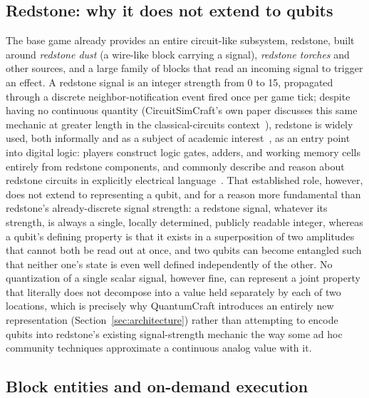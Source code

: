 \subsection{Redstone: why it does not extend to qubits}

The base game already provides an entire circuit-like subsystem, redstone, built around
\emph{redstone dust} (a wire-like block carrying a signal), \emph{redstone torches} and other
sources, and a large family of blocks that read an incoming signal to trigger an effect. A
redstone signal is an integer strength from 0 to 15, propagated through a discrete
neighbor-notification event fired once per game tick; despite having no continuous quantity
(CircuitSimCraft's own paper discusses this same mechanic at greater length in the
classical-circuits context~\cite{picos2026circuitsimcraft}), redstone is widely used, both
informally and as a subject of academic interest~\cite{nebel2016mining}, as an entry point
into digital logic:
players construct logic gates, adders, and working memory cells entirely from redstone
components, and commonly describe and reason about redstone circuits in explicitly
electrical language~\cite{dezuanni2015redstone}. That established role, however, does not
extend to representing a qubit, and for a reason more fundamental than redstone's
already-discrete signal strength: a redstone signal, whatever its strength, is always a
single, locally determined, publicly readable integer, whereas a qubit's defining property is
that it exists in a superposition of two amplitudes that cannot both be read out at once, and
two qubits can become entangled such that neither one's state is even well defined
independently of the other. No quantization of a single scalar signal, however fine, can
represent a joint property that literally does not decompose into a value held separately by
each of two locations, which is precisely why QuantumCraft introduces an entirely new
representation (Section~\ref{sec:architecture}) rather than attempting to encode qubits into
redstone's existing signal-strength mechanic the way some ad hoc community techniques
approximate a continuous analog value with it.

\subsection{Block entities and on-demand execution}

